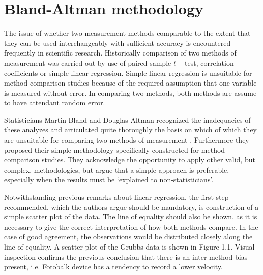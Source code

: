 \documentclass[12pt, a4paper]{report}
\theoremstyle{plain}
\theoremstyle{definition}
\theoremstyle{remark}
\begin{document}
	\section{Bland-Altman methodology}
	The issue of whether two measurement methods comparable to the 	extent that they can be used interchangeably with sufficient
	accuracy is encountered frequently in scientific research.
	Historically comparison of two methods of measurement was carried 	out by use of paired sample $t-$test, correlation coefficients or
	simple linear regression. Simple linear regression is unsuitable for method comparison studies because of the required assumption that one variable is measured without error. In comparing two methods, both methods are assume to have attendant random error.
	
	Statisticians Martin Bland and Douglas Altman recognized the inadequacies of these analyzes and
	articulated quite thoroughly the basis on which of which they are unsuitable for comparing two methods of measurement \citep*{BA83}. Furthermore they proposed their simple methodology specifically constructed for method comparison studies. They acknowledge the opportunity to apply other valid, but complex, methodologies, but argue that a simple approach is preferable, especially when the
	results must be `explained to non-statisticians'.
	
	Notwithstanding previous remarks about linear regression, the first step recommended, which the authors argue should be mandatory, is construction of a simple scatter plot of the data. The line of equality should also be shown, as it is necessary to give the correct interpretation of how both methods compare. In the case of good agreement, the observations would be distributed closely along the line of equality. A scatter plot of the Grubbs data is shown in Figure 1.1. Visual inspection confirms the previous conclusion that there is an inter-method bias present, i.e. Fotobalk device has a tendency to record a lower velocity.
	
\end{document}
